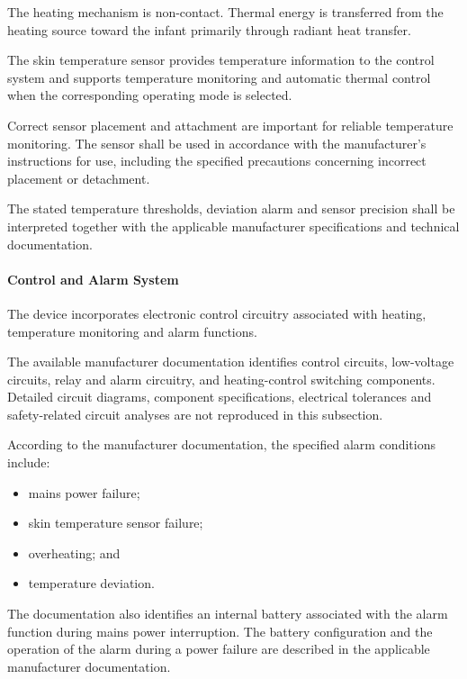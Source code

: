 The heating mechanism is non-contact. Thermal energy is transferred
from the heating source toward the infant primarily through
radiant heat transfer.

The skin temperature sensor provides temperature information to
the control system and supports temperature monitoring and
automatic thermal control when the corresponding operating mode
is selected.

Correct sensor placement and attachment are important for reliable
temperature monitoring. The sensor shall be used in accordance
with the manufacturer's instructions for use, including the
specified precautions concerning incorrect placement or
detachment.

The stated temperature thresholds, deviation alarm and sensor
precision shall be interpreted together with the applicable
manufacturer specifications and technical documentation.


\paragraph{Control and Alarm System}

The device incorporates electronic control circuitry associated
with heating, temperature monitoring and alarm functions.

The available manufacturer documentation identifies control
circuits, low-voltage circuits, relay and alarm circuitry, and
heating-control switching components. Detailed circuit diagrams,
component specifications, electrical tolerances and safety-related
circuit analyses are not reproduced in this subsection.

According to the manufacturer documentation, the specified
alarm conditions include:

\begin{itemize}
    \item mains power failure;
    \item skin temperature sensor failure;
    \item overheating; and
    \item temperature deviation.
\end{itemize}

The documentation also identifies an internal battery associated
with the alarm function during mains power interruption. The
battery configuration and the operation of the alarm during a
power failure are described in the applicable manufacturer
documentation.

